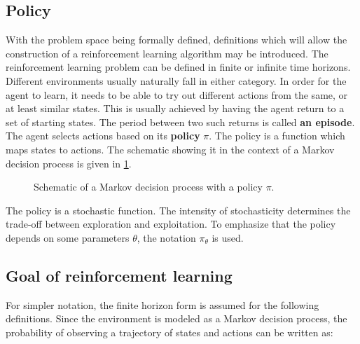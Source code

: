 \subsection{Policy}
With the problem space being formally defined,
definitions which will allow the construction
of a reinforcement learning algorithm may be introduced.
The reinforcement learning problem can be defined in finite or infinite time horizons.
Different environments usually naturally fall in either category.
In order for the agent to learn, it needs to be able to try out different actions from the same, 
or at least similar states.
This is usually achieved by having the agent return to a set of starting states.
The period between two such returns is called \textbf{an episode}.
The agent selects actions based on its \textbf{policy} $ \pi  $.
The policy is a function which maps states to actions.
The schematic showing it in the context of a Markov decision process
is given in \ref{fig:policy-in-mdp}.
\begin{figure}[htpb]
\begin{center}
\end{center}
\caption{Schematic of a Markov decision process with a policy $ \pi  $.}
\label{fig:policy-in-mdp}
\end{figure}

The policy is a stochastic function. The intensity of stochasticity determines the trade-off
between exploration and exploitation.
To emphasize that the policy depends on some parameters $ \theta  $,
the notation $ \pi_{ \theta } $ is used.

\subsection{Goal of reinforcement learning}
For simpler notation, the finite horizon form
is assumed for the following definitions.
Since the environment is modeled as a Markov decision process,
the probability of observing a trajectory of states
and actions can be written as:

